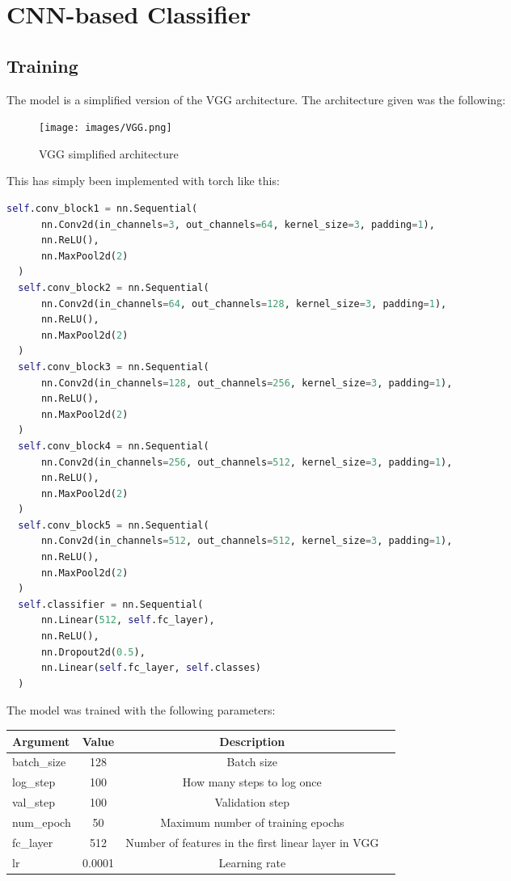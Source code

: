 \documentclass{ETHExercise}
\begin{document}
\newpage


\section{CNN-based Classifier}

\subsection{Training}
The model is a simplified version of the VGG architecture. The architecture given was
the following:

\begin{figure}[!h]
  \centering
  \texttt{[image: images/VGG.png]}
  \caption{VGG simplified architecture}
\end{figure}
This has simply been implemented with torch like this:
\newpage
\begin{lstlisting}[language=Python, caption= VGG layers]
  self.conv_block1 = nn.Sequential(
      nn.Conv2d(in_channels=3, out_channels=64, kernel_size=3, padding=1),
      nn.ReLU(),
      nn.MaxPool2d(2)
  )
  self.conv_block2 = nn.Sequential(
      nn.Conv2d(in_channels=64, out_channels=128, kernel_size=3, padding=1),
      nn.ReLU(),
      nn.MaxPool2d(2)
  )
  self.conv_block3 = nn.Sequential(
      nn.Conv2d(in_channels=128, out_channels=256, kernel_size=3, padding=1),
      nn.ReLU(),
      nn.MaxPool2d(2)
  )
  self.conv_block4 = nn.Sequential(
      nn.Conv2d(in_channels=256, out_channels=512, kernel_size=3, padding=1),
      nn.ReLU(),
      nn.MaxPool2d(2)
  )
  self.conv_block5 = nn.Sequential(
      nn.Conv2d(in_channels=512, out_channels=512, kernel_size=3, padding=1),
      nn.ReLU(),
      nn.MaxPool2d(2)
  )
  self.classifier = nn.Sequential(
      nn.Linear(512, self.fc_layer),
      nn.ReLU(),
      nn.Dropout2d(0.5),
      nn.Linear(self.fc_layer, self.classes)
  )
\end{lstlisting}


The model was trained with the following parameters:
\begin{center}
  \begin{tabular}{|l|c|c|c|}
    \hline
    \textbf{Argument} & \textbf{Value} &  \textbf{Description} \\
    \hline
    batch\_size & 128 & Batch size \\
    log\_step & 100 & How many steps to log once \\
    val\_step & 100 &  Validation step \\
    num\_epoch & 50 & Maximum number of training epochs \\
    fc\_layer & 512 & Number of features in the first linear layer in VGG \\
    lr & 0.0001 &  Learning rate \\
    \hline
  \end{tabular}
\end{center}
\end{document}
